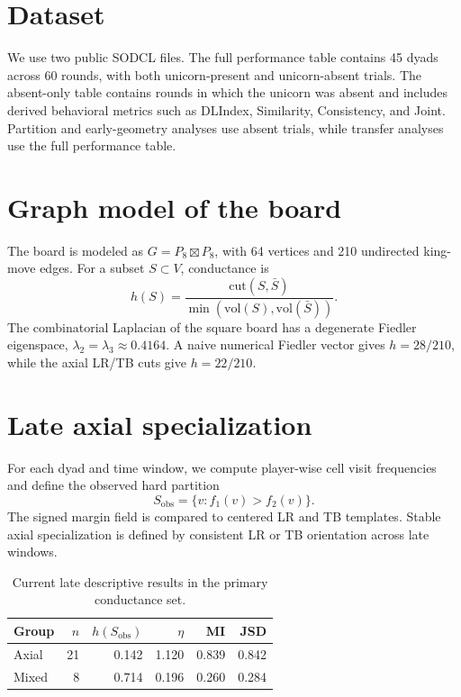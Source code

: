 \documentclass[11pt]{article}
\newcommand{\cut}{\mathrm{cut}}
\newcommand{\vol}{\mathrm{vol}}
\newcommand{\Sobs}{S_{\mathrm{obs}}}
\begin{document}
\section{Dataset}

We use two public SODCL files. The full performance table contains 45 dyads across 60 rounds, with both unicorn-present and unicorn-absent trials. The absent-only table contains rounds in which the unicorn was absent and includes derived behavioral metrics such as DLIndex, Similarity, Consistency, and Joint. Partition and early-geometry analyses use absent trials, while transfer analyses use the full performance table.

\section{Graph model of the board}

The board is modeled as $G=P_8 \boxtimes P_8$, with 64 vertices and 210 undirected king-move edges. For a subset $S\subset V$, conductance is
\[
 h(S)=\frac{\cut(S,\bar S)}{\min(\vol(S),\vol(\bar S))}.
\]
The combinatorial Laplacian of the square board has a degenerate Fiedler eigenspace, $\lambda_2=\lambda_3\approx 0.4164$. A naive numerical Fiedler vector gives $h=28/210$, while the axial LR/TB cuts give $h=22/210$.

\section{Late axial specialization}

For each dyad and time window, we compute player-wise cell visit frequencies and define the observed hard partition
\[
 \Sobs = \{v: f_1(v)>f_2(v)\}.
\]
The signed margin field is compared to centered LR and TB templates. Stable axial specialization is defined by consistent LR or TB orientation across late windows.

\begin{table}[h]
\centering
\caption{Current late descriptive results in the primary conductance set.}
\begin{tabular}{lrrrrr}
\toprule
Group & $n$ & $h(\Sobs)$ & $\eta$ & MI & JSD \\
\midrule
Axial & 21 & 0.142 & 1.120 & 0.839 & 0.842 \\
Mixed & 8 & 0.714 & 0.196 & 0.260 & 0.284 \\
\bottomrule
\end{tabular}
\end{table}
\end{document}
